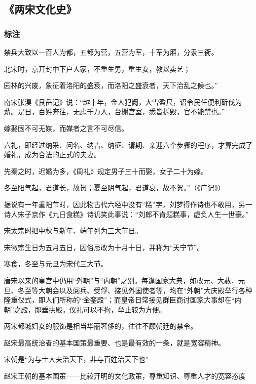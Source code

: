 \subsection{《两宋文化史》}
\subsubsection{标注}
禁兵大致以一百人为都，五都为营，五营为军，十军为厢，分隶三衙。

北宋时，京开封中下户人家，不重生男，重生女，教以卖艺；

园林的兴废，象征着洛阳的盛衰，而洛阳之盛衰者，天下治乱之候也。”

南宋张淏《艮岳记》说：“越十年，金人犯阙，大雪盈尺，诏令民任便利斫伐为薪。是日，百姓奔往，无虑千万人，台榭宫室，悉皆拆毁，官不能禁也。”

嫁娶固不可无媒，而媒者之言不可尽信。

六礼，即经过纳采、问名、纳吉、纳征、请期、亲迎六个步骤的程序，才算完成了婚礼，成为合法的正式的夫妻。

先秦之时，迟婚为多，《周礼》规定男子三十而娶，女子二十为嫁。

冬至阳气起，君道长，故贺；夏至阴气起，君道衰，故不贺。”（《广记》）

据说有一年重阳节时，因此物古代六经中没有“糕”字，刘梦得作诗也不敢用，另一诗人宋子京作《九日食糕》诗讥笑此事说：“刘郎不肯题糕事，虚负人生一世豪。”

宋太宗时把中秋与新年、端午列为三大节日。

宋徽宗生日为五月五日，因俗忌改为十月十日，并称为“天宁节”。

寒食，冬至与元旦为宋代三大节。

唐宋以来的皇宫中仍用“外朝”与“内朝”之别。每逢国家大典，如改元、大赦、元旦、冬至等大朝会以及阅兵、受俘、接见外国使者等，均在“外朝”大庆殿举行各种隆重仪式，即人们所称的“金銮殿”；而皇帝日常接见群臣商讨国家大事却在“内朝”之殿，即垂拱殿，仪礼可以不拘，举止较为方便。

两宋都城妇女的服饰是相当华丽奢侈的，往往不顾朝廷的禁令。

赵宋最高统治者的基本国策最重要、也是最有效的一条，就是宽容精神。

宋朝是“为与士大夫治天下，非与百姓治天下也”

赵宋王朝的基本国策——比较开明的文化政策，尊重知识、尊重人才的宽容态度